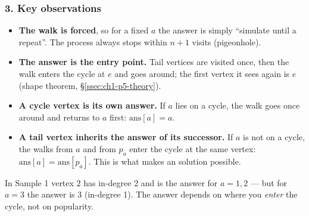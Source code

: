 \begin{diagrambox}
\end{diagrambox}

\subsubsection*{3. Key observations}

\begin{itemize}[leftmargin=*]
    \item \textbf{The walk is forced}, so for a fixed $a$ the answer is simply ``simulate until a repeat''. The process always stops within $n+1$ visits (pigeonhole).
    \item \textbf{The answer is the entry point.} Tail vertices are visited once, then the walk enters the cycle at $e$ and goes around; the first vertex it sees again is $e$ (shape theorem, \S\ref{ssec:ch1-p5-theory}).
    \item \textbf{A cycle vertex is its own answer.} If $a$ lies on a cycle, the walk goes once around and returns to $a$ first: $\text{ans}[a] = a$.
    \item \textbf{A tail vertex inherits the answer of its successor.} If $a$ is not on a cycle, the walks from $a$ and from $p_a$ enter the cycle at the same vertex: $\text{ans}[a] = \text{ans}[p_a]$. This is what makes an  solution possible.
\end{itemize}

\begin{warningbox}
In Sample 1 vertex $2$ has in-degree 2 and is the answer for $a = 1, 2$ --- but for $a = 3$ the answer is $3$ (in-degree 1). The answer depends on where you \emph{enter} the cycle, not on popularity.
\end{warningbox}

